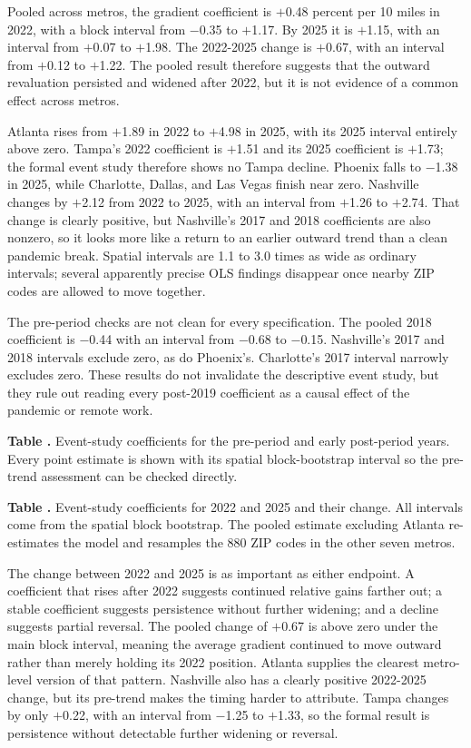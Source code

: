 \documentclass[11pt]{article}
\newcounter{tabnum}
\newcommand{\tabH}[3]{%
  \begin{table}[H]\centering
  \refstepcounter{tabnum}\label{#2}%
  {\small\raggedright\textbf{Table \thetabnum.} #3\par}\vspace{3pt}
  
  \end{table}}
\begin{document}
Pooled across metros, the gradient coefficient is $+$0.48 percent per 10 miles in 2022, with a block interval from
$-$0.35 to $+$1.17. By 2025 it is $+$1.15, with an interval from $+$0.07 to $+$1.98. The 2022-2025 change is $+$0.67, with an
interval from $+$0.12 to $+$1.22. The pooled result therefore suggests that the outward revaluation persisted and widened after
2022, but it is not evidence of a common effect across metros.

Atlanta rises from $+$1.89 in 2022 to $+$4.98 in 2025, with its 2025 interval entirely above zero. Tampa's 2022 coefficient is
$+$1.51 and its 2025 coefficient is $+$1.73; the formal event study therefore shows no Tampa decline. Phoenix falls to $-$1.38 in
2025, while Charlotte, Dallas, and Las Vegas finish near zero. Nashville changes by $+$2.12 from 2022 to 2025, with an interval from
$+$1.26 to $+$2.74. That change is clearly positive, but Nashville's 2017 and 2018 coefficients are also nonzero, so it looks more
like a return to an earlier outward trend than a clean pandemic break. Spatial intervals are 1.1 to 3.0 times as wide as ordinary
intervals; several apparently precise OLS findings disappear once nearby ZIP codes are allowed to move together.

The pre-period checks are not clean for every specification. The pooled 2018 coefficient is $-$0.44 with an interval from $-$0.68
to $-$0.15. Nashville's 2017 and 2018 intervals exclude zero, as do Phoenix's. Charlotte's 2017 interval narrowly excludes zero.
These results do not invalidate the descriptive event study, but they rule out reading every post-2019 coefficient as a causal
effect of the pandemic or remote work.

\tabH{t_m_event_pre}{tab:eventpre}{Event-study coefficients for the pre-period and early post-period years. Every point estimate is
shown with its spatial block-bootstrap interval so the pre-trend assessment can be checked directly.}

\tabH{t_m_event_post}{tab:event}{Event-study coefficients for 2022 and 2025 and their change. All intervals come from the spatial
block bootstrap. The pooled estimate excluding Atlanta re-estimates the model and resamples the 880 ZIP codes in the other seven
metros.}

The change between 2022 and 2025 is as important as either endpoint. A coefficient that rises after 2022 suggests continued
relative gains farther out; a stable coefficient suggests persistence without further widening; and a decline suggests partial
reversal. The pooled change of $+$0.67 is above zero under the main block interval, meaning the average gradient continued to move
outward rather than merely holding its 2022 position. Atlanta supplies the clearest metro-level version of that pattern. Nashville
also has a clearly positive 2022-2025 change, but its pre-trend makes the timing harder to attribute. Tampa changes by only $+$0.22,
with an interval from $-$1.25 to $+$1.33, so the formal result is persistence without detectable further widening or reversal.
\end{document}
